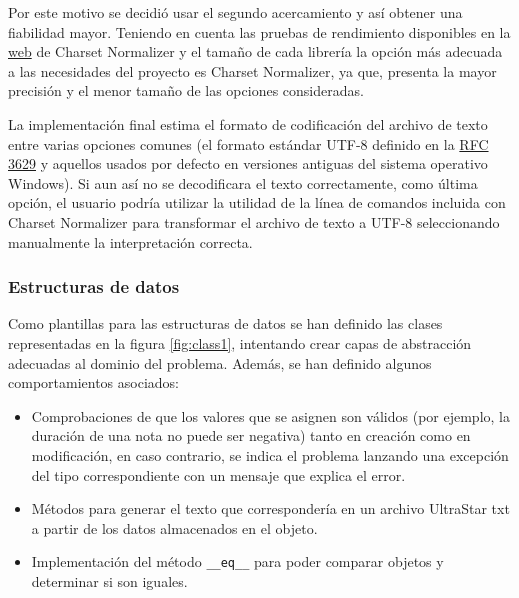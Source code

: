 Por este motivo se decidió usar el segundo acercamiento y así obtener una fiabilidad mayor. Teniendo en cuenta las pruebas de rendimiento disponibles en la \href{https://github.com/Ousret/charset_normalizer}{web} de Charset Normalizer y el tamaño de cada librería la opción más adecuada a las necesidades del proyecto es Charset Normalizer, ya que, presenta la mayor precisión y el menor tamaño de las opciones consideradas.

La implementación final estima el formato de codificación del archivo de texto entre varias opciones comunes (el formato estándar UTF-8 definido en la \href{https://www.rfc-editor.org/rfc/rfc3629}{RFC 3629} y aquellos usados por defecto en versiones antiguas del sistema operativo Windows). Si aun así no se decodificara el texto correctamente, como última opción, el usuario podría utilizar la utilidad de la línea de comandos incluida con Charset Normalizer para transformar el archivo de texto a UTF-8 seleccionando manualmente la interpretación correcta.

\subsubsection{Estructuras de datos}

Como plantillas para las estructuras de datos se han definido las clases representadas en la figura \ref{fig:class1}, intentando crear capas de abstracción adecuadas al dominio del problema. Además, se han definido algunos comportamientos asociados:
\begin{itemize}
	\item{Comprobaciones de que los valores que se asignen son válidos (por ejemplo, la duración de una nota no puede ser negativa) tanto en creación como en modificación, en caso contrario, se indica el problema lanzando una excepción del tipo correspondiente con un mensaje que explica el error.}
	\item{Métodos para generar el texto que correspondería en un archivo UltraStar txt a partir de los datos almacenados en el objeto.}
	\item{Implementación del método \texttt{\_\_eq\_\_} para poder comparar objetos  y determinar si son iguales.}
\end{itemize}

